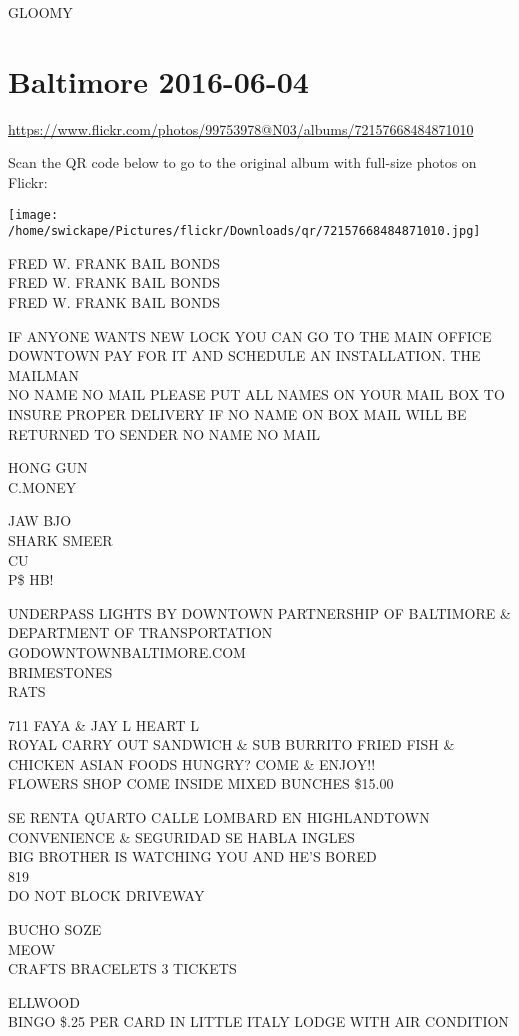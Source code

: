 \documentclass[10pt,letterpaper]{article}
\begin{document}
GLOOMY


\section*{Baltimore 2016-06-04}

\url{https://www.flickr.com/photos/99753978@N03/albums/72157668484871010}

Scan the QR code below to go to the original album with full-size photos on Flickr:

\texttt{[image: /home/swickape/Pictures/flickr/Downloads/qr/72157668484871010.jpg]}


FRED W. FRANK BAIL BONDS\\
FRED W. FRANK BAIL BONDS\\
FRED W. FRANK BAIL BONDS

IF ANYONE WANTS NEW LOCK YOU CAN GO TO THE MAIN OFFICE DOWNTOWN PAY FOR IT AND SCHEDULE AN INSTALLATION. THE MAILMAN\\
NO NAME NO MAIL PLEASE PUT ALL NAMES ON YOUR MAIL BOX TO INSURE PROPER DELIVERY IF NO NAME ON BOX MAIL WILL BE RETURNED TO SENDER NO NAME NO MAIL

HONG GUN\\
C.MONEY

JAW BJO\\
SHARK SMEER\\
CU\\
P\$ HB!

UNDERPASS LIGHTS BY DOWNTOWN PARTNERSHIP OF BALTIMORE \& DEPARTMENT OF TRANSPORTATION GODOWNTOWNBALTIMORE.COM\\
BRIMESTONES\\
RATS

711 FAYA \& JAY L HEART L\\
ROYAL CARRY OUT SANDWICH \& SUB BURRITO FRIED FISH \& CHICKEN ASIAN FOODS HUNGRY?  COME \& ENJOY!!\\
FLOWERS SHOP COME INSIDE MIXED BUNCHES \$15.00

SE RENTA QUARTO CALLE LOMBARD EN HIGHLANDTOWN CONVENIENCE \& SEGURIDAD SE HABLA INGLES\\
BIG BROTHER IS WATCHING YOU AND HE'S BORED\\
819\\
DO NOT BLOCK DRIVEWAY

BUCHO SOZE\\
MEOW\\
CRAFTS BRACELETS 3 TICKETS

ELLWOOD\\
BINGO \$.25 PER CARD IN LITTLE ITALY LODGE WITH AIR CONDITION
\end{document}
